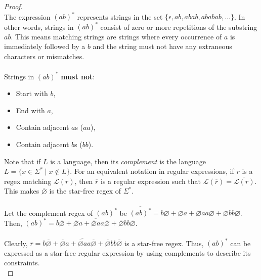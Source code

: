 \documentclass[12pt]{article}
\begin{document}
\begin{proof}
\leavevmode\\
    The expression $(ab)^*$ represents strings in the set $\{ \epsilon, ab, abab, ababab, \dots\}$. In other words, strings in $(ab)^*$ consist of zero or more repetitions of the substring $ab$. This means matching strings are strings where every occurrence of $a$ is immediately followed by a $b$ and the string must not have any extraneous characters or mismatches. \\
    \\
    Strings in $(ab)^*$ \textbf{must not}:
    \begin{itemize}
        \item Start with $b$,
        \item End with $a$,
        \item Contain adjacent $a$s ($aa$),
        \item Contain adjacent $b$s ($bb$).
    \end{itemize}
    Note that if $L$ is a language, then its \textit{complement} is the language $\overline{L} = \{x \in \Sigma^* \mid x \notin L\}$. For an equivalent notation in regular expressions, if $r$ is a regex matching $\mathcal{L}(r)$, then $\overline{r}$ is a regular expression such that $\mathcal{L}(\overline{r}) = \overline{\mathcal{L}(r)}$. This makes $\overline{\varnothing}$ is the star-free regex of $\Sigma^*$. \\
    \\
    Let the complement regex of $(ab)^*$ be \(\overline{(ab)^*} = b\overline{\varnothing} + \overline{\varnothing}a + \overline{\varnothing}aa\overline{\varnothing} + \overline{\varnothing}bb\overline{\varnothing}\). \\
    Then, \((ab)^* = \overline{b\overline{\varnothing} + \overline{\varnothing}a + \overline{\varnothing}aa\overline{\varnothing} + \overline{\varnothing}bb\overline{\varnothing}}\). \\
    \\
    Clearly, $r = \overline{b\overline{\varnothing} + \overline{\varnothing}a + \overline{\varnothing}aa\overline{\varnothing} + \overline{\varnothing}bb\overline{\varnothing}}$ is a star-free regex. Thus, $(ab)^*$ can be expressed as a star-free regular expression by using complements to describe its constraints. \\
\end{proof}
\leavevmode\\
\end{document}
